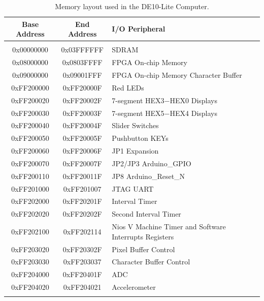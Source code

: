 \documentclass[11pt, twoside, pdftex]{article}
\newcommand{\systemName}{DE10-Lite Computer}
\begin{document}
\begin{table}[h]
    \begin{center}
    \begin{tabular}{c|c|l}
            \textbf{Base Address}
            & \textbf{End Address}
            & \textbf{I/O Peripheral}
				\\\hline\vspace{-3mm}\\
            0x00000000
            & 0x03FFFFFF
            & SDRAM
        \\
            0x08000000
            & 0x0803FFFF
            & FPGA On-chip Memory
        \\
            0x09000000
            & 0x09001FFF
            & FPGA On-chip Memory Character Buffer
        \\
            0xFF200000
            & 0xFF20000F
            & Red LEDs
        \\
            0xFF200020
            & 0xFF20002F
            & 7-segment HEX3$-$HEX0 Displays
        \\
            0xFF200030
            & 0xFF20003F
            & 7-segment HEX5$-$HEX4 Displays

        \\
            0xFF200040
            & 0xFF20004F
            & Slider Switches
        \\
            0xFF200050
            & 0xFF20005F
            & Pushbutton KEYs
        \\
            0xFF200060
            & 0xFF20006F
            & JP1 Expansion
        \\
            0xFF200070
            & 0xFF20007F
            & JP2/JP3 Arduino\_GPIO
        \\
            0xFF200110
            & 0xFF20011F
            & JP8 Arduino\_Reset\_N
        \\
            0xFF201000
            & 0xFF201007
            & JTAG UART
        \\
            0xFF202000
            & 0xFF20201F
            & Interval Timer
        \\
            0xFF202020
            & 0xFF20202F
            & Second Interval Timer
        \\
            0xFF202100
            & 0xFF202114
            & Nios V Machine Timer and Software Interrupts Registers
        \\
            0xFF203020
            & 0xFF20302F
            & Pixel Buffer Control
        \\
            0xFF203030
            & 0xFF203037
            & Character Buffer Control
        \\
            0xFF204000
            & 0xFF20401F
            & ADC
         \\
            0xFF204020
            & 0xFF204021
            & Accelerometer
        \\
        \\
    \end{tabular}
    \caption{Memory layout used in the \systemName.}
    \label{tab:memorylayout}
    \end{center}
\end{table}
\end{document}
